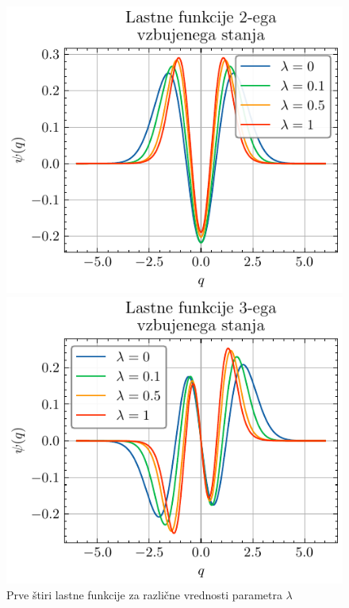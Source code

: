 \documentclass[slovene,11pt,a4paper]{article}
\begin{document}
\begin{figure}[ht]
\begin{minipage}{0.48\textwidth}
  \end{minipage}

  \begin{minipage}{0.48\textwidth}
    \centering
    \includegraphics[width=\linewidth]{graphs/eig2.pdf}
    
  \end{minipage}%
  \hfill%
  \begin{minipage}{0.48\textwidth}
    \centering
    \includegraphics[width=\linewidth]{graphs/eig3.pdf}
    
  \end{minipage}
  \caption{Prve štiri lastne funkcije za različne vrednosti parametra $\lambda$}
  \label{fig: eig}
\end{figure}
\end{document}
